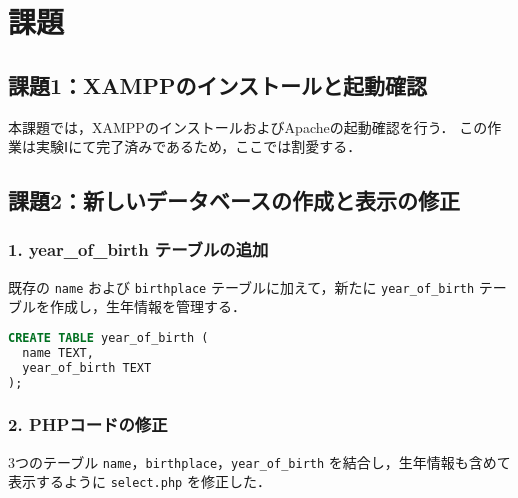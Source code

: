 \section{課題}

\subsection*{課題1：XAMPPのインストールと起動確認}

本課題では，XAMPPのインストールおよびApacheの起動確認を行う．
この作業は実験Ⅰにて完了済みであるため，ここでは割愛する．

\subsection*{課題2：新しいデータベースの作成と表示の修正}

\subsubsection*{1. year\_of\_birth テーブルの追加}

既存の \texttt{name} および \texttt{birthplace} テーブルに加えて，新たに \texttt{year\_of\_birth} テーブルを作成し，生年情報を管理する．

\begin{lstlisting}[language=SQL]
CREATE TABLE year_of_birth (
  name TEXT,
  year_of_birth TEXT
);
\end{lstlisting}

\subsubsection*{2. PHPコードの修正}

3つのテーブル \texttt{name}，\texttt{birthplace}，\texttt{year\_of\_birth} を結合し，生年情報も含めて表示するように \texttt{select.php} を修正した．

